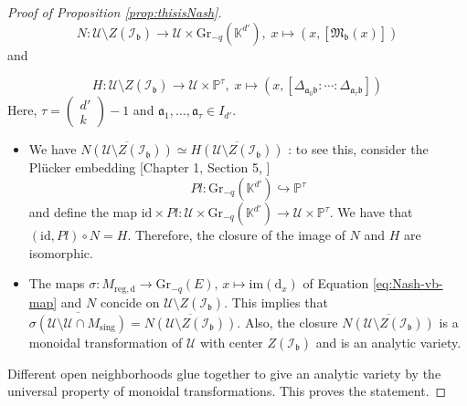 \documentclass[10pt]{article}
\theoremstyle{plain}
\theoremstyle{definition}
\theoremstyle{remark}
\newcommand{\dd}{\mathrm{d}}
\begin{document}
\begin{proof}[Proof of Proposition \ref{prop:thisisNash}]
\begin{equation}
    N\colon \mathcal{U}\setminus Z(\mathcal{I}_\mathfrak b)\longrightarrow \mathcal{U}\times \mathrm{Gr}_{-q}( \mathbb K^{d'}),\; x\longmapsto \left(x, [\mathfrak M_\mathfrak b(x)]\right) 
\end{equation}
and 

\begin{equation}
    H\colon \mathcal{U}\setminus Z(\mathcal{I}_\mathfrak b)\longrightarrow \mathcal{U}\times \mathbb P^{\tau},\; x\longmapsto \left(x, [\Delta_{\mathfrak a_0 \mathfrak b}\colon\cdots\colon \Delta_{\mathfrak a_{\tau} \mathfrak b}]\right) 
\end{equation}
Here, $\tau=\begin{pmatrix}
    d'\\k
\end{pmatrix}-1$ and $\mathfrak a_1,\ldots, \mathfrak a_\tau\in I_{d'}$. 

\begin{itemize}
 \item [(a)] We have $\overline{N(\mathcal{U}\setminus Z(\mathcal{I}_\mathfrak b))}\simeq \overline{H(\mathcal{U}\setminus Z(\mathcal{I}_\mathfrak b))}$ : to see this, consider the Plücker embedding [Chapter 1, Section 5, \cite{Weyman_2003}] $${Pl}\colon \mathrm{Gr}_{-q}(\mathbb K^{d'})\hookrightarrow \mathbb P^\tau$$ and define the map $\mathrm{id}\times Pl \colon \mathcal{U}\times \mathrm{Gr}_{-q}(\mathbb K^{d'})\longrightarrow \mathcal{U}\times \mathbb P^\tau$. We have that $(\mathrm{id}, Pl)\circ N=H$. Therefore,  the closure of the image of $N$ and $H$ are isomorphic.
    \item [(b)] The maps $\sigma\colon M_{\mathrm{reg},\dd}\longrightarrow \mathrm{Gr}_{-q}(E),\, x\longmapsto \mathrm{im}(\dd_x)$ of Equation \eqref{eq:Nash-vb-map} and $N$ concide on $\mathcal{U}\setminus Z(\mathcal{I}_\mathfrak b)$. This implies that $\overline{\sigma(\mathcal{U}\setminus \mathcal{U}\cap M_{\mathrm{sing}})}=\overline{N(\mathcal{U}\setminus Z(\mathcal{I}_\mathfrak b))}$. Also, the closure $\overline{N(\mathcal{U}\setminus Z(\mathcal{I}_\mathfrak b))}$ is a monoidal transformation of $\mathcal{U}$ with center $Z(\mathcal{I}_\mathfrak b)$ and is an analytic variety.
\end{itemize}
Different open neighborhoods glue together to give an analytic variety by the universal property of monoidal transformations. This proves the statement.
%
%
\end{proof}
\end{document}
